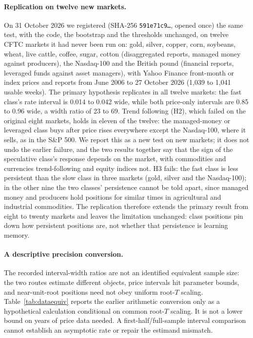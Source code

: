 \documentclass[12pt]{article}
\theoremstyle{definition}
\theoremstyle{remark}
\begin{document}
\paragraph{Replication on twelve new markets.} On 31 October 2026 we registered (SHA-256 \texttt{591e71c9\ldots}, opened once) the same test, with the code, the bootstrap and the thresholds unchanged, on twelve CFTC markets it had never been run on: gold, silver, copper, corn, soybeans, wheat, live cattle, coffee, sugar, cotton (disaggregated reports, managed money against producers), the Nasdaq-100 and the British pound (financial reports, leveraged funds against asset managers), with Yahoo Finance front-month or index prices and reports from June 2006 to 27 October 2026 (1,039 to 1,041 usable weeks). The primary hypothesis replicates in all twelve markets: the fast class's rate interval is 0.014 to 0.042 wide, while both price-only intervals are 0.85 to 0.96 wide, a width ratio of 23 to 69. Trend following (H2), which failed on the original eight markets, holds in eleven of the twelve: the managed-money or leveraged class buys after price rises everywhere except the Nasdaq-100, where it sells, as in the S\&P 500. We report this as a new test on new markets; it does not undo the earlier failure, and the two results together say that the sign of the speculative class's response depends on the market, with commodities and currencies trend-following and equity indices not. H3 fails: the fast class is less persistent than the slow class in three markets (gold, silver and the Nasdaq-100); in the other nine the two classes' persistence cannot be told apart, since managed money and producers hold positions for similar times in agricultural and industrial commodities. The replication therefore extends the primary result from eight to twenty markets and leaves the limitation unchanged: class positions pin down how persistent positions are, not whether that persistence is learning memory.

\paragraph{A descriptive precision conversion.} The recorded interval-width ratios are not an identified equivalent sample size: the two routes estimate different objects, price intervals hit parameter bounds, and near-unit-root positions need not obey uniform root-$T$ scaling. Table~\ref{tab:dataequiv} reports the earlier arithmetic conversion only as a hypothetical calculation conditional on common root-$T$ scaling. It is not a lower bound on years of price data needed. A first-half/full-sample interval comparison cannot establish an asymptotic rate or repair the estimand mismatch.
\end{document}
